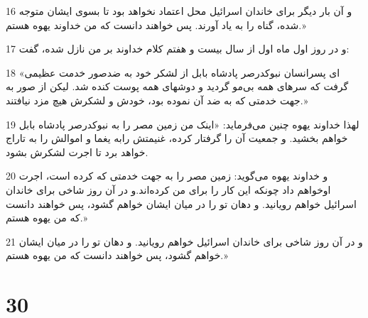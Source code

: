\par 16 و آن بار دیگر برای خاندان اسرائیل محل اعتماد نخواهد بود تا بسوی ایشان متوجه شده، گناه را به یاد آورند. پس خواهند دانست که من خداوند یهوه هستم.»
\par 17 و در روز اول ماه اول از سال بیست و هفتم کلام خداوند بر من نازل شده، گفت:
\par 18 «ای پسرانسان نبوکدرصر پادشاه بابل از لشکر خود به ضدصور خدمت عظیمی گرفت که سرهای همه بی‌مو گردید و دوشهای همه پوست کنده شد. لیکن از صور به جهت خدمتی که به ضد آن نموده بود، خودش و لشکرش هیچ مزد نیافتند.»
\par 19 لهذا خداوند یهوه چنین می‌فرماید: «اینک من زمین مصر را به نبوکدرصر پادشاه بابل خواهم بخشید. و جمعیت آن را گرفتار کرده، غنیمتش رابه یغما و اموالش را به تاراج خواهد برد تا اجرت لشکرش بشود.
\par 20 و خداوند یهوه می‌گوید: زمین مصر را به جهت خدمتی که کرده است، اجرت اوخواهم داد چونکه این کار را برای من کرده‌اند.و در آن روز شاخی برای خاندان اسرائیل خواهم رویانید. و دهان تو را در میان ایشان خواهم گشود، پس خواهند دانست که من یهوه هستم.»
\par 21 و در آن روز شاخی برای خاندان اسرائیل خواهم رویانید. و دهان تو را در میان ایشان خواهم گشود، پس خواهند دانست که من یهوه هستم.»

\chapter{30}

